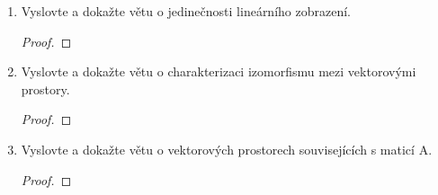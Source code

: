 \documentclass[10pt,a4paper]{article}
\begin{document}
\begin{enumerate}
\paragraph{Steinitzova o výměně} $V$ je vektorový prostor nad $\mathbb{K}$ a $X \subseteq V$ je lineárně nezávislá množina a $Y$ je systém generátorů $V$, kde Y je konečná.

Potom platí $|X| \leq |Y|$ a existuje $Z$, taková že: \begin{enumerate}
\item $\mathfrak{L}(Z) = V$
\item $|Z| = |Y|$
\item $X \subseteq Z$
\item $Z \setminus X \subseteq Y$
\end{enumerate}

\begin{proof}
Indukcí dle $|X \setminus Y|$
\begin{itemize}
\item Základní krok $|X \setminus Y| = 0$: Určitě platí $|X| \leq |Y|$, lze použít $Z = Y$
\item Indukční krok $X \setminus Y \neq \emptyset$

Vyberu $u \in X \setminus Y$ libovolné a položíme $X^\prime = X \setminus u$

Použijeme indukční předpoklad pro $X^\prime$ a $Y$ a najdeme $Z^\prime$ splňující předpoklady a-d.

Použijeme  lemma o výměně pro $Z^\prime = \{ v_1, ..., v_n\}$ a $u$ vyměníme za $v_i$, takové že $v_i \in Z^\prime \setminus X^\prime$.

Takové $v_i$ existuje, protože jinak by byla $X^\prime$ lineárně závislá. (je to složité na představu, intuitivně: množina Y umí vygenerovat u, ale množina $X^\prime$ to nemůže umět, jinak by $X^\prime \cup {u}$ nebylo lin. nezavislé...).
\end{itemize}
\end{proof}


\item Vyslovte a dokažte větu o jedinečnosti lineárního zobrazení.

\begin{proof}

\end{proof}

\item Vyslovte a dokažte větu o charakterizaci izomorfismu mezi vektorovými prostory.

\begin{proof}

\end{proof}

\item Vyslovte a dokažte větu o vektorových prostorech souvisejících s maticí A.

\begin{proof}

\end{proof}

\end{enumerate}
\end{document}
